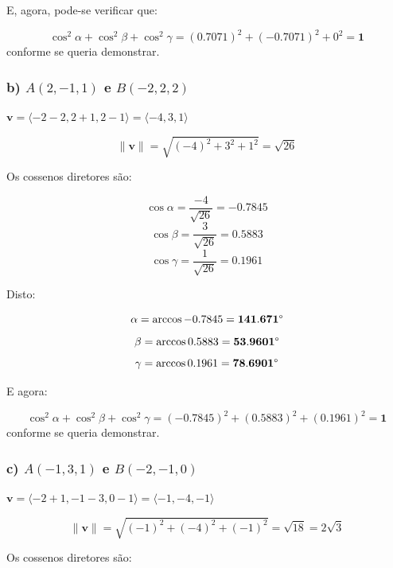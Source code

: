\documentclass[a4paper,11pt,pagenumber=true]{article}
\newcommand{\vecnorm}[1]{\|\mathbf{#1}\|}
\theoremstyle{mytheor}
\begin{document}
                E, agora, pode-se verificar que:
                
                \[ 
                    \cos^2 \alpha + \cos^2 \beta + \cos^2 \gamma = 
                    (0.7071)^2 + (-0.7071)^2 + 0^2 = \mathbf{1}
                \] conforme se queria demonstrar.
                
           \subsubsection*{b) $A(2,-1,1)$ e $B(-2,2,2)$}
                
                $\mathbf{v} = \langle -2 - 2, 2 + 1, 2 - 1 \rangle = \langle -4, 3, 1 \rangle$
                
                \[ \vecnorm{v} = \sqrt{(-4)^2 + 3^2 + 1^2} = \sqrt{26} \]
                
                Os cossenos diretores são:
                
                \[ \cos \alpha = \frac{-4}{\sqrt{26}}  = \mathbf{-0.7845} \]
                \[ \cos \beta  = \frac{3}{\sqrt{26}} = \mathbf{0.5883} \]
                \[ \cos \gamma = \frac{1}{\sqrt{26}}  = \mathbf{0.1961} \]
        
                Disto:
                
                \[\alpha = \arccos -0.7845 = \mathbf{141.671\degree}\]
                \[\beta  = \arccos 0.5883  = \mathbf{53.9601\degree}\]
                \[\gamma = \arccos 0.1961  = \mathbf{78.6901\degree}\]
                
                E agora: 
                
                \[ 
                    \cos^2 \alpha + \cos^2 \beta + \cos^2 \gamma = 
                    (-0.7845)^2 + (0.5883)^2 + (0.1961)^2 = \mathbf{1}
                \] conforme se queria demonstrar.        
                
           \subsubsection*{c) $A(-1,3,1)$ e $B(-2,-1,0)$}
                
                $\mathbf{v} = \langle -2 + 1, -1 - 3, 0 - 1 \rangle = \langle -1, -4, -1 \rangle$
                
                \[ \vecnorm{v} = \sqrt{(-1)^2 + (-4)^2 + (-1)^2} = \sqrt{18} = 2\sqrt{3} \]
                
                Os cossenos diretores são:
                
\end{document}
